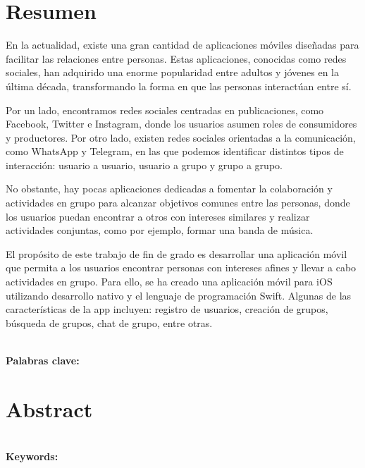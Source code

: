 \documentclass{book}
\begin{document}
\begingroup
\chapter{Resumen}
En la actualidad, existe una gran cantidad de aplicaciones 
móviles diseñadas para facilitar las relaciones entre personas. 
Estas aplicaciones, conocidas como redes sociales, han adquirido 
una enorme popularidad entre adultos y jóvenes en la última década, 
transformando la forma en que las personas interactúan entre sí.

Por un lado, encontramos redes sociales centradas en publicaciones, 
como Facebook, Twitter e Instagram, donde los usuarios asumen roles 
de consumidores y productores. Por otro lado, existen redes sociales 
orientadas a la comunicación, como WhatsApp y Telegram, en las que 
podemos identificar distintos tipos de interacción: usuario a usuario, 
usuario a grupo y grupo a grupo.

No obstante, hay pocas aplicaciones dedicadas a fomentar la colaboración 
y actividades en grupo para alcanzar objetivos comunes entre las personas, 
donde los usuarios puedan encontrar a otros con intereses similares y 
realizar actividades conjuntas, como por ejemplo, formar una banda de música.

El propósito de este trabajo de fin de grado es desarrollar una 
aplicación móvil que permita a los usuarios encontrar personas con 
intereses afines y llevar a cabo actividades en grupo. Para ello, 
se ha creado una aplicación móvil para iOS utilizando desarrollo 
nativo y el lenguaje de programación Swift. Algunas de las características 
de la app incluyen: registro de usuarios, creación de grupos, búsqueda de 
grupos, chat de grupo, entre otras.

\textbf{\\\large Palabras clave: }

\chapter{Abstract}
\lipsum[2-4]

\textbf{\\\large Keywords: }
\endgroup
\end{document}
